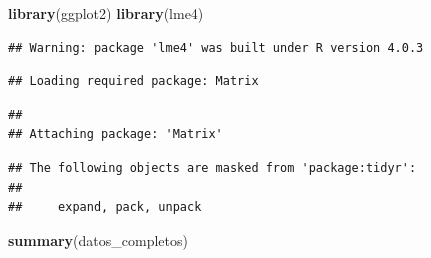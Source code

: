 \documentclass[
  11pt,
]{article}
\newenvironment{Shaded}{\begin{snugshade}}{\end{snugshade}}
\newcommand{\CommentTok}[1]{\textcolor[rgb]{0.56,0.35,0.01}{\textit{#1}}}
\newcommand{\DataTypeTok}[1]{\textcolor[rgb]{0.13,0.29,0.53}{#1}}
\newcommand{\DecValTok}[1]{\textcolor[rgb]{0.00,0.00,0.81}{#1}}
\newcommand{\KeywordTok}[1]{\textcolor[rgb]{0.13,0.29,0.53}{\textbf{#1}}}
\newcommand{\NormalTok}[1]{#1}
\newcommand{\OperatorTok}[1]{\textcolor[rgb]{0.81,0.36,0.00}{\textbf{#1}}}
\newcommand{\StringTok}[1]{\textcolor[rgb]{0.31,0.60,0.02}{#1}}
\begin{document}
\begin{Shaded}
\end{Shaded}

\begin{Shaded}
\begin{Highlighting}[]
\KeywordTok{library}\NormalTok{(ggplot2)}
\KeywordTok{library}\NormalTok{(lme4)}
\end{Highlighting}
\end{Shaded}

\begin{verbatim}
## Warning: package 'lme4' was built under R version 4.0.3
\end{verbatim}

\begin{verbatim}
## Loading required package: Matrix
\end{verbatim}

\begin{verbatim}
## 
## Attaching package: 'Matrix'
\end{verbatim}

\begin{verbatim}
## The following objects are masked from 'package:tidyr':
## 
##     expand, pack, unpack
\end{verbatim}

\begin{Shaded}
\begin{Highlighting}[]
\KeywordTok{summary}\NormalTok{(datos_completos)}
\end{Highlighting}
\end{Shaded}
\end{document}
